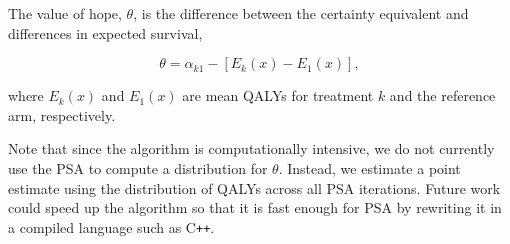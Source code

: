 \documentclass[11pt,final,fleqn]{article}\usepackage[]{graphicx}\usepackage[]{color}
\theoremstyle{plain}
\newcommand\CPP{{C\texttt{++}}}
\begin{document}
\begin{appendices}
The value of hope, $\theta$, is the difference between the certainty equivalent and differences in expected survival,

\begin{equation}
\theta = \alpha_{k1} - \left[E_k(x) - E_1(x) \right],
\end{equation}     

where $E_k(x)$ and $E_1(x)$ are mean QALYs for treatment $k$ and the reference arm, respectively. 

Note that since the algorithm is computationally intensive, we do not currently use the PSA to compute a distribution for $\theta$. Instead, we estimate a point estimate using the distribution of QALYs across all PSA iterations. Future work could speed up the algorithm so that it is fast enough for PSA by rewriting it in a compiled language such as \CPP{}.  

\end{appendices}

\end{document}
